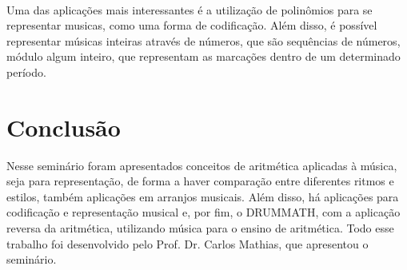 \documentclass{article}
\begin{document}
	\paragraph{}
	Uma das aplicações mais interessantes é a utilização de polinômios para se representar musicas, como uma forma de codificação. Além disso, é possível representar músicas inteiras através de números, que são sequências de números, módulo algum inteiro, que representam as marcações dentro de um determinado período.
	
	\section{Conclusão}
	Nesse seminário foram apresentados conceitos de aritmética aplicadas à música, seja para representação, de forma a haver comparação entre diferentes ritmos e estilos, também aplicações em arranjos musicais. Além disso, há aplicações para codificação e representação musical e, por fim, o DRUMMATH, com a aplicação reversa da aritmética, utilizando música para o ensino de aritmética. Todo esse trabalho foi desenvolvido pelo Prof. Dr. Carlos Mathias, que apresentou o seminário.
	
\end{document}
